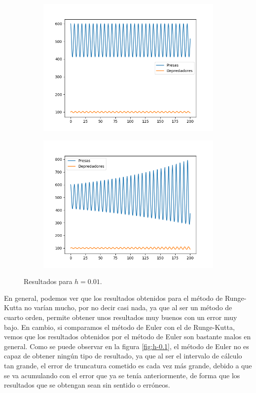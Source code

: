 \documentclass[11pt,a4paper]{article}
\begin{document}
\begin{figure}[H]
\centering
\begin{subfigure}{.5\textwidth}
	\centering
	\includegraphics[scale=0.45]{img/rk-0-01}
\end{subfigure}%
\begin{subfigure}{.5\textwidth}
	\centering
	\includegraphics[scale=0.45]{img/eu-0-01}
\end{subfigure}
\caption{Resultados para $h=0.01$.}
\label{fig:h-0.01}
\end{figure}


En general, podemos ver que los resultados obtenidos para el método de Runge-Kutta
no varían mucho, por no decir casi nada, ya que al ser un método de cuarto orden, permite
obtener unos resultados muy buenos con un error muy bajo. En cambio, si comparamos
el método de Euler con el de Runge-Kutta, vemos que los resultados obtenidos por
el método de Euler son bastante malos en general. Como se puede
observar en la figura \ref{fig:h-0.1}, el método de Euler no es capaz de obtener ningún
tipo de resultado, ya que al ser el intervalo de cálculo tan grande, el error de truncatura
cometido es cada vez más grande, debido a que se va acumulando con el error que ya se tenía
anteriormente, de forma que los resultados que se obtengan sean sin sentido o erróneos.
\end{document}
